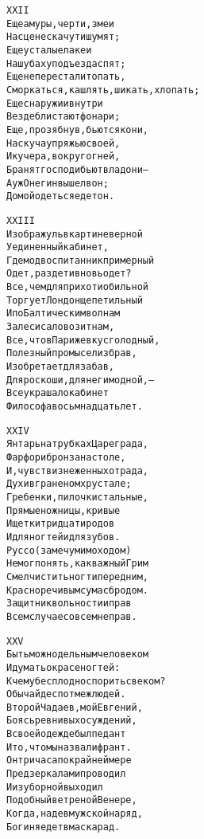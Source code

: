 \begin{minipage}[t]{\dimexpr 0.5\textwidth -\tabcolsep-.5pt}
\begin{alltt}\normalfont\centering
XXII
Еще амуры, черти, змеи
На сцене скачут и шумят;
Еще усталые лакеи
На шубах у подъезда спят;
Еще не перестали топать,
Сморкаться, кашлять, шикать, хлопать;
Еще снаружи и внутри
Везде блистают фонари;
Еще, прозябнув, бьются кони,
Наскуча упряжью своей,
И кучера, вокруг огней,
Бранят господ и бьют в ладони —
А уж Онегин вышел вон;
Домой одеться едет он.
\end{alltt}
\end{minipage}
\clearpage

\begin{minipage}[t]{\dimexpr 0.5\textwidth -\tabcolsep-.5pt}
\begin{alltt}\normalfont\centering
XXIII
Изображу ль в картине верной
Уединенный кабинет,
Где мод воспитанник примерный
Одет, раздет и вновь одет?
Все, чем для прихоти обильной
Торгует Лондон щепетильный
И по Балтическим волнам
За лес и сало возит нам,
Все, что в Париже вкус голодный,
Полезный промысел избрав,
Изобретает для забав,
Для роскоши, для неги модной, —
Все украшало кабинет
Философа в осьмнадцать лет.
\end{alltt}
\end{minipage}

\begin{minipage}[t]{\dimexpr 0.5\textwidth -\tabcolsep-.5pt}
\begin{alltt}\normalfont\centering
XXIV
Янтарь на трубках Цареграда,
Фарфор и бронза на столе,
И, чувств изнеженных отрада,
Духи в граненом хрустале;
Гребенки, пилочки стальные,
Прямые ножницы, кривые
И щетки тридцати родов
И для ногтей и для зубов.
Руссо (замечу мимоходом)
Не мог понять, как важный Грим
Смел чистить ногти перед ним,
Красноречивым сумасбродом.
Защитник вольности и прав
В сем случае совсем неправ.
\end{alltt}
\end{minipage}
\clearpage

\begin{minipage}[t]{\dimexpr 0.5\textwidth -\tabcolsep-.5pt}
\begin{alltt}\normalfont\centering
XXV
Быть можно дельным человеком
И думать о красе ногтей:
К чему бесплодно спорить с веком?
Обычай деспот меж людей.
Второй Чадаев, мой Евгений,
Боясь ревнивых осуждений,
В своей одежде был педант
И то, что мы назвали франт.
Он три часа по крайней мере
Пред зеркалами проводил
И из уборной выходил
Подобный ветреной Венере,
Когда, надев мужской наряд,
Богиня едет в маскарад.
\end{alltt}
\end{minipage}

